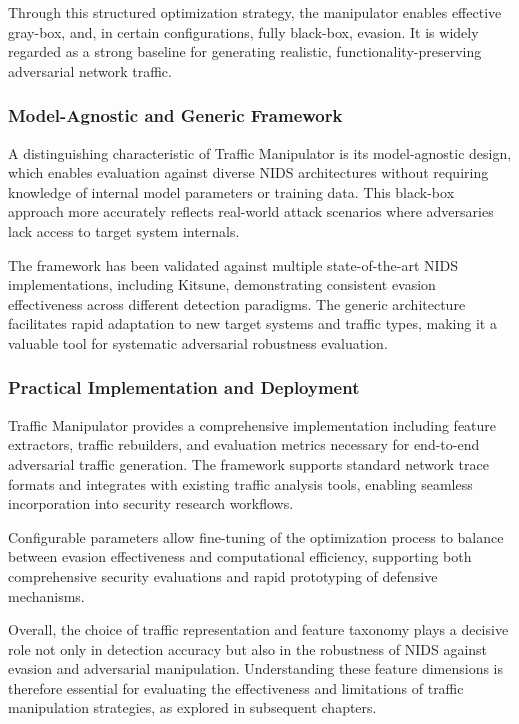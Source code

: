 Through this structured optimization strategy, the manipulator enables effective gray-box, and, in certain configurations, fully black-box, evasion. It is widely regarded as a strong baseline for generating realistic, functionality-preserving adversarial network traffic.

\subsubsection{Model-Agnostic and Generic Framework}

A distinguishing characteristic of Traffic Manipulator is its model-agnostic design, which enables evaluation against diverse NIDS architectures without requiring knowledge of internal model parameters or training data. This black-box approach more accurately reflects real-world attack scenarios where adversaries lack access to target system internals.

The framework has been validated against multiple state-of-the-art NIDS implementations, including Kitsune, demonstrating consistent evasion effectiveness across different detection paradigms. The generic architecture facilitates rapid adaptation to new target systems and traffic types, making it a valuable tool for systematic adversarial robustness evaluation.

\subsubsection{Practical Implementation and Deployment}

Traffic Manipulator provides a comprehensive implementation including feature extractors, traffic rebuilders, and evaluation metrics necessary for end-to-end adversarial traffic generation. The framework supports standard network trace formats and integrates with existing traffic analysis tools, enabling seamless incorporation into security research workflows.

Configurable parameters allow fine-tuning of the optimization process to balance between evasion effectiveness and computational efficiency, supporting both comprehensive security evaluations and rapid prototyping of defensive mechanisms.

Overall, the choice of traffic representation and feature taxonomy plays a decisive role not only in detection accuracy but also in the robustness of NIDS against evasion and adversarial manipulation. 
Understanding these feature dimensions is therefore essential for evaluating the effectiveness and limitations of traffic manipulation strategies, as explored in subsequent chapters.
